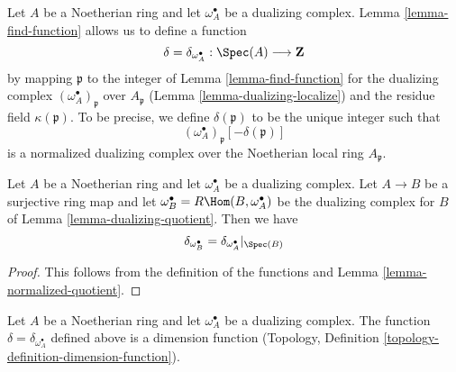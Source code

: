\noindent
Let $A$ be a Noetherian ring and let $\omega_A^\bullet$ be a dualizing
complex. Lemma \ref{lemma-find-function} allows us to define a function
$$
\delta = \delta_{\omega_A^\bullet} : \Spec(A) \longrightarrow \mathbf{Z}
$$
by mapping $\mathfrak p$ to the integer of Lemma \ref{lemma-find-function}
for the dualizing complex $(\omega_A^\bullet)_\mathfrak p$
over $A_\mathfrak p$ (Lemma \ref{lemma-dualizing-localize})
and the residue field $\kappa(\mathfrak p)$. To be precise, we define
$\delta(\mathfrak p)$ to be the unique integer such that
$$
(\omega_A^\bullet)_\mathfrak p[-\delta(\mathfrak p)]
$$
is a normalized dualizing complex over the Noetherian local ring
$A_\mathfrak p$.

\begin{lemma}
\label{lemma-quotient-function}
Let $A$ be a Noetherian ring and let $\omega_A^\bullet$ be a dualizing
complex. Let $A \to B$ be a surjective ring map and let
$\omega_B^\bullet = R\Hom(B, \omega_A^\bullet)$ be the dualizing
complex for $B$ of Lemma \ref{lemma-dualizing-quotient}. Then we have
$$
\delta_{\omega_B^\bullet} = \delta_{\omega_A^\bullet}|_{\Spec(B)}
$$
\end{lemma}

\begin{proof}
This follows from the definition of the functions and
Lemma \ref{lemma-normalized-quotient}.
\end{proof}

\begin{lemma}
\label{lemma-dimension-function}
Let $A$ be a Noetherian ring and let $\omega_A^\bullet$ be a dualizing
complex. The function $\delta = \delta_{\omega_A^\bullet}$
defined above is a dimension function
(Topology, Definition \ref{topology-definition-dimension-function}).
\end{lemma}

